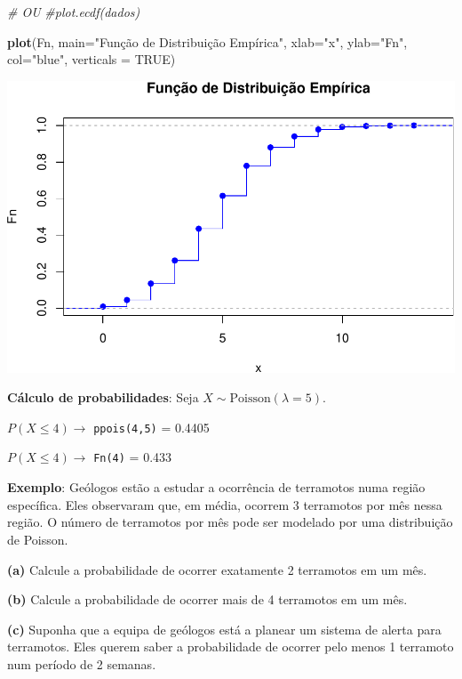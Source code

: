 \documentclass[
]{book}
\newenvironment{Shaded}{\begin{snugshade}}{\end{snugshade}}
\newcommand{\AttributeTok}[1]{\textcolor[rgb]{0.13,0.29,0.53}{#1}}
\newcommand{\CommentTok}[1]{\textcolor[rgb]{0.56,0.35,0.01}{\textit{#1}}}
\newcommand{\ConstantTok}[1]{\textcolor[rgb]{0.56,0.35,0.01}{#1}}
\newcommand{\FunctionTok}[1]{\textcolor[rgb]{0.13,0.29,0.53}{\textbf{#1}}}
\newcommand{\NormalTok}[1]{#1}
\newcommand{\StringTok}[1]{\textcolor[rgb]{0.31,0.60,0.02}{#1}}
\begin{document}
\begin{Shaded}
\begin{Highlighting}[]
\CommentTok{\# OU}
\CommentTok{\#plot.ecdf(dados)}

\FunctionTok{plot}\NormalTok{(Fn, }\AttributeTok{main=}\StringTok{"Função de Distribuição Empírica"}\NormalTok{,}
     \AttributeTok{xlab=}\StringTok{"x"}\NormalTok{,}
     \AttributeTok{ylab=}\StringTok{"Fn"}\NormalTok{,}
     \AttributeTok{col=}\StringTok{"blue"}\NormalTok{,}
     \AttributeTok{verticals =} \ConstantTok{TRUE}\NormalTok{)}
\end{Highlighting}
\end{Shaded}

\includegraphics{introR_files/figure-latex/unnamed-chunk-265-2.pdf}

\textbf{Cálculo de probabilidades}: Seja \(X\sim\text{Poisson}(\lambda=5)\).

\(P(X\leq 4) \to\) \texttt{ppois(4,5)} = 0.4405

\(P(X \leq 4) \to\) \texttt{Fn(4)} = 0.433

\textbf{Exemplo}: Geólogos estão a estudar a ocorrência de terramotos numa região específica. Eles observaram que, em média, ocorrem 3 terramotos por mês nessa região. O número de terramotos por mês pode ser modelado por uma distribuição de Poisson.

\textbf{(a)} Calcule a probabilidade de ocorrer exatamente 2 terramotos em um mês.

\textbf{(b)} Calcule a probabilidade de ocorrer mais de 4 terramotos em um mês.

\textbf{(c)} Suponha que a equipa de geólogos está a planear um sistema de alerta para terramotos. Eles querem saber a probabilidade de ocorrer pelo menos 1 terramoto num período de 2 semanas.
\end{document}
